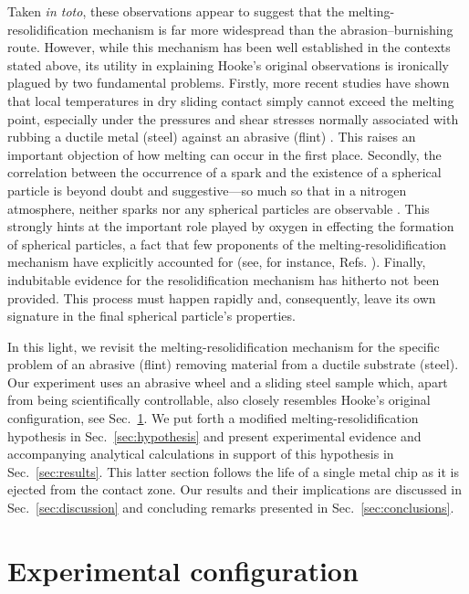 \documentclass[11pt]{article}
\begin{document}
Taken \emph{in toto}, these observations appear to suggest that the melting-resolidification mechanism is far more widespread than the abrasion--burnishing route. However, while this mechanism has been well established in the contexts stated above, its utility in explaining Hooke's original observations is ironically plagued by two fundamental problems. Firstly, more recent studies have shown that local temperatures in dry sliding contact simply cannot exceed the melting point, especially under the pressures and shear stresses normally associated with rubbing a ductile metal (steel) against an abrasive (flint) \cite{shen2008thermocouple, malkin2007thermal, Shaw1996, hwang2003measurement}. This raises an important objection of how melting can occur in the first place. Secondly, the correlation between the occurrence of a spark and the existence of a spherical particle is beyond doubt and suggestive---so much so that in a nitrogen atmosphere, neither sparks nor any spherical particles are observable \cite{LingLuThesis, LingLuETAL1992}. This strongly hints at the important role played by oxygen in effecting the formation of spherical particles, a fact that few proponents of the melting-resolidification mechanism have explicitly accounted for (see, for instance, Refs. \cite{KleisETAL1979, KomanduriShaw1975, RamanathETAL1987}). Finally, indubitable evidence for the resolidification mechanism has hitherto not been provided. This process must happen rapidly and, consequently, leave its own signature in the final spherical particle's properties.

In this light, we revisit the melting-resolidification mechanism for the specific problem of an abrasive (flint) removing material from a ductile substrate (steel). Our experiment uses an abrasive wheel and a sliding steel sample which, apart from being scientifically controllable, also closely resembles Hooke's original configuration, see Sec.~\ref{sec:experimental}. We put forth a modified melting-resolidification hypothesis in Sec.~\ref{sec:hypothesis} and present experimental evidence and accompanying analytical calculations in support of this hypothesis in Sec.~\ref{sec:results}. This latter section follows the life of a single metal chip as it is ejected from the contact zone. Our results and their implications are discussed in Sec.~\ref{sec:discussion} and concluding remarks presented in Sec.~\ref{sec:conclusions}.

\section{Experimental configuration}
\label{sec:experimental}
\end{document}
